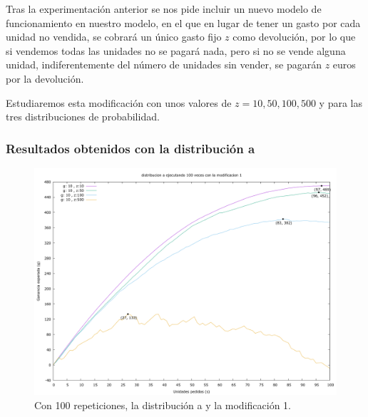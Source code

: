 \documentclass[12pt, spanish]{article}
\begin{document}
Tras la experimentación anterior se nos pide incluir un nuevo modelo de funcionamiento en nuestro modelo, en el que en lugar de tener un gasto por cada unidad no vendida, se cobrará un único gasto fijo $z$ como devolución, por lo que si vendemos todas las unidades no se pagará nada, pero si no se vende alguna unidad, indiferentemente del número de unidades sin vender, se pagarán $z$ euros por la devolución.

Estudiaremos esta modificación con unos valores de $z = 10, 50, 100, 500$ y para las tres distribuciones de probabilidad.

\subsubsection{Resultados obtenidos con la distribución a}


\begin{figure}[H]
	\centering
	\includegraphics[scale = 0.2]{prob_a/datos_a_100_1.png}
	\caption{Con 100 repeticiones, la distribución a y la modificación 1.}
	\label{fig:ej1_a_100}

\end{figure}
\end{document}
